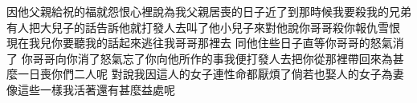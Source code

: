 因他父親給祝的福\chientien 就怨恨\chientien 心裡說\chientien 為我父親居喪的日子近了\chientien 到那時候\chientien 我要殺我的兄弟\chuan{}
有人把大兒子的話告訴\chientien 他就打發人去\chientien 叫了他小兒子來\chientien 對他說\chientien 你哥哥殺你\chientien 報仇雪恨\chuan 
{}現在我兒\chientien 你要聽我的話\chientien 起來逃往我哥哥那裡去\yuentien 
{}同他住些日子\chientien 直等你哥哥的怒氣消了\yuentien 
{}你哥哥向你消了怒氣\chientien 忘了你向他所作的事\chientien 我便打發人去把你從那裡帶回來\yuentien 為甚麼一日喪你們二人呢\chuan\Chuan 
{}對說\chientien 我因這人的女子\chientien 連性命都厭煩了\yuentien 倘若也娶人的女子為妻\chientien 像這些一樣\chientien 我活著還有甚麼益處呢\chuan 
